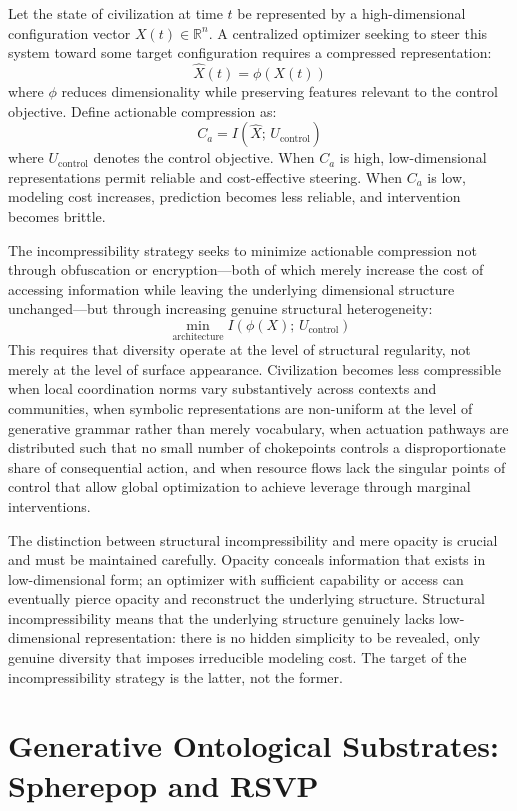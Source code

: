 \documentclass[12pt]{article}
\begin{document}
Let the state of civilization at time $t$ be represented by a high-dimensional configuration vector $X(t) \in \mathbb{R}^n$. A centralized optimizer seeking to steer this system toward some target configuration requires a compressed representation:
\[
\hat{X}(t) = \phi(X(t))
\]
where $\phi$ reduces dimensionality while preserving features relevant to the control objective. Define actionable compression as:
\[
C_a = I(\hat{X};\, U_{\text{control}})
\]
where $U_{\text{control}}$ denotes the control objective. When $C_a$ is high, low-dimensional representations permit reliable and cost-effective steering. When $C_a$ is low, modeling cost increases, prediction becomes less reliable, and intervention becomes brittle.

The incompressibility strategy seeks to minimize actionable compression not through obfuscation or encryption---both of which merely increase the cost of accessing information while leaving the underlying dimensional structure unchanged---but through increasing genuine structural heterogeneity:
\[
\min_{\text{architecture}} I(\phi(X);\, U_{\text{control}})
\]
This requires that diversity operate at the level of structural regularity, not merely at the level of surface appearance. Civilization becomes less compressible when local coordination norms vary substantively across contexts and communities, when symbolic representations are non-uniform at the level of generative grammar rather than merely vocabulary, when actuation pathways are distributed such that no small number of chokepoints controls a disproportionate share of consequential action, and when resource flows lack the singular points of control that allow global optimization to achieve leverage through marginal interventions.

The distinction between structural incompressibility and mere opacity is crucial and must be maintained carefully. Opacity conceals information that exists in low-dimensional form; an optimizer with sufficient capability or access can eventually pierce opacity and reconstruct the underlying structure. Structural incompressibility means that the underlying structure genuinely lacks low-dimensional representation: there is no hidden simplicity to be revealed, only genuine diversity that imposes irreducible modeling cost. The target of the incompressibility strategy is the latter, not the former.

\section{Generative Ontological Substrates: Spherepop and RSVP}
\end{document}
